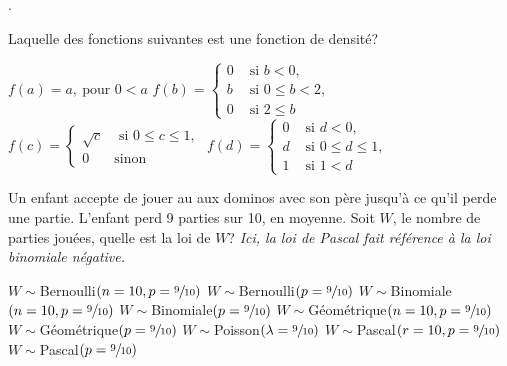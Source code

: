 \newpage . \newpage
\begin{questions}

\question[3] Laquelle des fonctions suivantes est une fonction de densité? 

\begin{checkboxes}
\choice $f(a)=a,\ \mbox{pour } 0 <a$
		\vspace{0.3cm}
\correctchoice $ f(b) = \left\{
			\begin{array}{ll}
			0  & \mbox{ si } b<0, \\
			b & \mbox{ si } 0\leq b < 2,\\
			0 & \mbox{ si } 2 \leq b
			\end{array}
			\right. $\\
\choice $ f(c) = \left\{
			\begin{array}{ll}
			\sqrt{c}  & \mbox{ si } 0\leq c\leq 1, \\
			0 & \mbox{sinon}
			\end{array}
			\right. $
\choice $ f(d) = \left\{
			\begin{array}{ll}
			0  & \mbox{ si } d < 0, \\
			d & \mbox{ si } 0 \leq d \leq 1,\\
			1 &  \mbox{ si } 1 < d
			\end{array}
			\right. $
\end{checkboxes}

\vspace{1cm}

\question[3] Un enfant accepte de jouer au aux dominos avec son père jusqu'à ce qu'il perde une partie. L'enfant perd 9 parties sur 10, en moyenne. Soit $W$, le nombre de parties jouées, quelle est la loi de $W$? \textit{Ici, la loi de Pascal fait référence à la loi binomiale négative.}

\begin{checkboxes}
    \choice $W\sim$Bernoulli$(n=10, p=\sfrac{9}{10})$
    \choice $W\sim$Bernoulli$(p=\sfrac{9}{10})$
    \choice $W\sim$Binomiale$(n=10, p=\sfrac{9}{10})$
    \choice $W\sim$Binomiale$(p=\sfrac{9}{10})$
    \choice $W\sim$Géométrique$(n=10, p=\sfrac{9}{10})$
    \correctchoice $W\sim$Géométrique$(p=\sfrac{9}{10})$
    \choice $W\sim$Poisson$(\lambda=\sfrac{9}{10})$
    \choice $W\sim$Pascal$(r=10, p=\sfrac{9}{10})$
    \choice $W\sim$Pascal$(p=\sfrac{9}{10})$


\end{checkboxes}

\vspace{1cm}



\end{questions}
